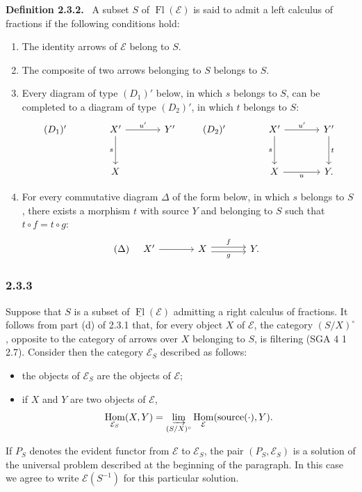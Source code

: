 \documentclass[11pt]{article}
\newenvironment{statement}[1]{\par\medskip\noindent\textbf{#1.}\ }{\par\medskip}
\DeclareMathOperator{\Hom}{Hom}
\providecommand{\Hom}{\operatorname{Hom}}
\providecommand{\Fl}{\operatorname{Fl}}
\providecommand{\cE}{\mathcal E}
\providecommand{\source}{\operatorname{source}}
\providecommand{\Hom}{\operatorname{Hom}}
\begin{document}
\begin{statement}{Definition 2.3.2}
A subset $S$ of $\Fl(\cE)$ is said to admit a left calculus of fractions if the following conditions hold:
\begin{enumerate}[label=(\alph*)]
\item[(a')] The identity arrows of $\cE$ belong to $S$.
\item[(b')] The composite of two arrows belonging to $S$ belongs to $S$.
\item[(c')] Every diagram of type $(D_1)'$ below, in which $s$ belongs to $S$, can be completed to a diagram of type $(D_2)'$, in which $t$ belongs to $S$:
\[
\begin{tikzcd}[column sep=large,row sep=large]
(D_1)'& X' \arrow[r,"u'"] \arrow[d,"s"'] & Y'\\
& X
\end{tikzcd}
\qquad
\begin{tikzcd}[column sep=large,row sep=large]
(D_2)'& X' \arrow[r,"u'"] \arrow[d,"s"'] & Y' \arrow[d,"t"]\\
& X \arrow[r,"u"'] & Y .
\end{tikzcd}
\]
\item[(d')] For every commutative diagram $\Delta$ of the form below, in which $s$ belongs to $S$, there exists a morphism $t$ with source $Y$ and belonging to $S$ such that $t\circ f=t\circ g$:
\[
(\Delta)\quad
\begin{tikzcd}[column sep=large]
X' \arrow[r] & X \arrow[r,shift left,"f"] \arrow[r,shift right,"g"'] & Y .
\end{tikzcd}
\]
\end{enumerate}
\end{statement}

\subsubsection*{2.3.3}
Suppose that $S$ is a subset of $\underline{\Fl}(\cE)$ admitting a right calculus of fractions. It follows from part (d) of 2.3.1 that, for every object $X$ of $\cE$, the category $(S/X)^\circ$, opposite to the category of arrows over $X$ belonging to $S$, is filtering (SGA 4 1 2.7). Consider then the category $\cE_S$ described as follows:
\begin{itemize}
\item the objects of $\cE_S$ are the objects of $\cE$;
\item if $X$ and $Y$ are two objects of $\cE$,
\[
\Hom_{\cE_S}(X,Y)=\varinjlim_{(S/X)^\circ}\Hom_{\cE}(\source(\cdot),Y).
\]
\end{itemize}
If $P_S$ denotes the evident functor from $\cE$ to $\cE_S$, the pair $(P_S,\cE_S)$ is a solution of the universal problem described at the beginning of the paragraph. In this case we agree to write $\cE(S^{-1})$ for this particular solution.
\end{document}
